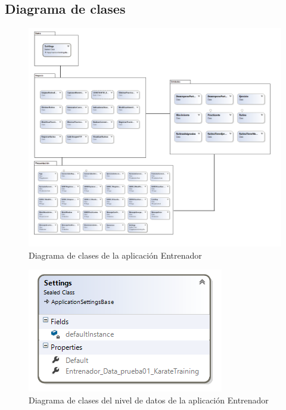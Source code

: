 \subsection{Diagrama de clases}

\begin{figure}[H]
	\begin{center}
		\includegraphics[scale=0.55]{./Figuras/Arquitectura/DiagramadeclasesEntrenador}
	\end{center}
	\caption{Diagrama de clases de la aplicación Entrenador}
	\label{fig:DC_entrenador}
\end{figure}

\begin{figure}[H]
	\begin{center}
		\includegraphics[scale=1]{./Figuras/Arquitectura/Datos_Entrenador}
	\end{center}
	\caption{Diagrama de clases del nivel de datos de la aplicación Entrenador}
	\label{fig:DCE_Datos}
\end{figure}

